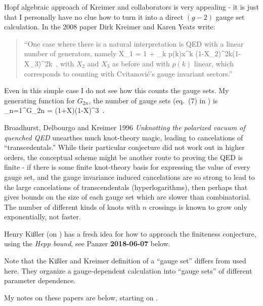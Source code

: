 Hopf algebraic approach of Kreimer and collaborators is very appealing - it is just that I
personally have no clue how to turn it into a direct $(g-2)$ gauge set
calculation. In the 2008 paper
 {Dirk Kreimer} and
{Karen Yeats} write:
    \begin{quote}
``One case where there is a natural interpretation is QED with a linear
number of generators, namely
\beq
X_1 = 1 + \sum_{k }p(k)x^k
           {(1-X_2)^{2k}(1-X_3)^{2k}}
\,,
with $X_2$ and $X_3$ as before and with $p(k)$ linear, which corresponds
to counting with Cvitanovi\'c's gauge invariant sectors.''
    \end{quote}
Even in this simple case I do not see how this counts the gauge sets. My
generating function for $G_{2n}$, the number of gauge sets
(eq.~(7) in )  is
\beq
\sum_{n=1}^\infty G_{2n}
    =
           {(1+X)(1-X)^{3}}
\,.

Broadhurst, Delbourgo and Kreimer 1996 {\em Unknotting the
polarized vacuum of quenched {QED}} unearthes much knot-theory magic,
leading to cancelations of ``transcedentals.'' While their
particular conjecture did not work out
in higher orders, the conceptual scheme might be another
route to proving the QED is finite - if there is some finite knot-theory
basis for expressing the value of every gauge set, and the gauge
invariance induced cancelations are so strong to lead to the large
cancelations of transcendentals (hyperlogarithms), then perhaps that
gives bounds on the size of each gauge set which are slower than
combinatorial. The number of different kinds of knots with $n$ crossings
is known to grow only exponentially, not faster.

Henry Ki{\ss}ler (on ) has a fresh idea for how to
approach the finiteness conjecture, using the \emph{Hepp bound},
see Panzer {\bf 2018-06-07} below.

Note that the Ki{\ss}ler and Kreimer definition of a ``gauge
set'' differs from  used here. They organize a
gauge-dependent calculation into ``gauge sets'' of different parameter
dependence.

My notes on these papers are below, starting on .

